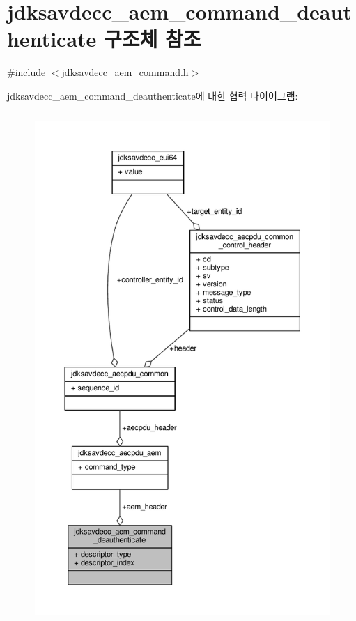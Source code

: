 \hypertarget{structjdksavdecc__aem__command__deauthenticate}{}\section{jdksavdecc\+\_\+aem\+\_\+command\+\_\+deauthenticate 구조체 참조}
\label{structjdksavdecc__aem__command__deauthenticate}


{\ttfamily \#include $<$jdksavdecc\+\_\+aem\+\_\+command.\+h$>$}



jdksavdecc\+\_\+aem\+\_\+command\+\_\+deauthenticate에 대한 협력 다이어그램\+:
\nopagebreak
\begin{figure}[H]
\begin{center}
\leavevmode
\includegraphics[height=550pt]{structjdksavdecc__aem__command__deauthenticate__coll__graph}
\end{center}
\end{figure}
